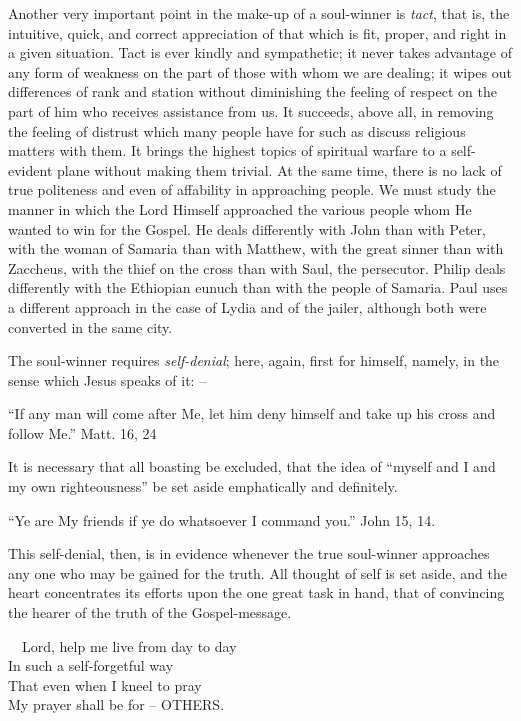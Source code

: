\documentclass[
]{book}
\begin{document}
Another very important point in the make-up of a soul-winner is \emph{tact}, that is, the intuitive, quick, and correct appreciation of that which is fit, proper, and right in a given situation. Tact is ever kindly and sympathetic; it never takes advantage of any form of weakness on the part of those with whom we are dealing; it wipes out differences of rank and station without diminishing the feeling of respect on the part of him who receives assistance from us. It succeeds, above all, in removing the feeling of distrust which many people have for such as discuss religious matters with them. It brings the highest topics of spiritual warfare to a self-evident plane without making them trivial. At the same time, there is no lack of true politeness and even of affability in approaching people. We must study the manner in which the Lord Himself approached the various people whom He wanted to win for the Gospel. He deals differently with John than with Peter, with the woman of Samaria than with Matthew, with the great sinner than with Zaccheus, with the thief on the cross than with Saul, the persecutor. Philip deals differently with the Ethiopian eunuch than with the people of Samaria. Paul uses a different approach in the case of Lydia and of the jailer, although both were converted in the same city.

The soul-winner requires \emph{self-denial}; here, again, first for himself, namely, in the sense which Jesus speaks of it: --

``If any man will come after Me, let him deny himself and take up his cross and follow Me.'' Matt. 16, 24

It is necessary that all boasting be excluded, that the idea of ``myself and I and my own righteousness'' be set aside emphatically and definitely.

``Ye are My friends if ye do whatsoever I command you.'' John 15, 14.

This self-denial, then, is in evidence whenever the true soul-winner approaches any one who may be gained for the truth. All thought of self is set aside, and the heart concentrates its efforts upon the one great task in hand, that of convincing the hearer of the truth of the Gospel-message.

~~Lord, help me live from day to day\\
\hspace*{0.333em}\hspace*{0.333em}In such a self-forgetful way\\
\hspace*{0.333em}\hspace*{0.333em}That even when I kneel to pray\\
\hspace*{0.333em}\hspace*{0.333em}My prayer shall be for -- OTHERS.
\end{document}
